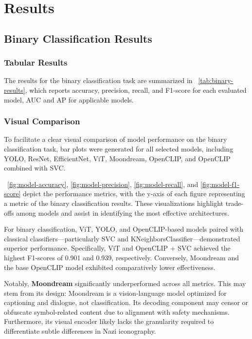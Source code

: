
\chapter{Results}\label{chapter:results}


\section{Binary Classification Results}

\subsection{Tabular Results}

The results for the binary classification task are summarized in ~\autoref{tab:binary-results}, which reports
accuracy, precision, recall, and F1-score for each evaluated model, \ac{AUC} and \ac{AP} for applicable models.



\subsection{Visual Comparison}

To facilitate a clear visual comparison of model performance on the binary classification task, bar plots were
generated for all selected models, including \ac{YOLO}, \ac{ResNet}, EfficientNet, \ac{ViT}, Moondream, OpenCLIP, and
OpenCLIP combined with \ac{SVC}.

~\autoref{fig:model-accuracy}, \autoref{fig:model-precision}, \autoref{fig:model-recall}, and
\autoref{fig:model-f1-score} depict the performance metrics, with the y-axis of each figure representing a metric of
the binary classification results. These visualizations highlight trade-offs among models and assist in identifying
the most effective architectures.

For binary classification, \ac{ViT}, \ac{YOLO}, and OpenCLIP-based models paired with classical
classifiers—particularly \ac{SVC} and KNeighborsClassifier—demonstrated superior performance. Specifically, \ac{ViT} and
OpenCLIP + \ac{SVC} achieved the highest F1-scores of 0.901 and 0.939, respectively. Conversely, Moondream and the
base OpenCLIP model exhibited comparatively lower effectiveness.

Notably, \textbf{Moondream} significantly underperformed across all metrics. This may stem from its design:
Moondream is a vision-language model optimized for captioning and dialogue, not classification. Its decoding
component may censor or obfuscate symbol-related content due to alignment with safety mechanisms. Furthermore, its
visual encoder likely lacks the granularity required to differentiate subtle differences in Nazi iconography.

